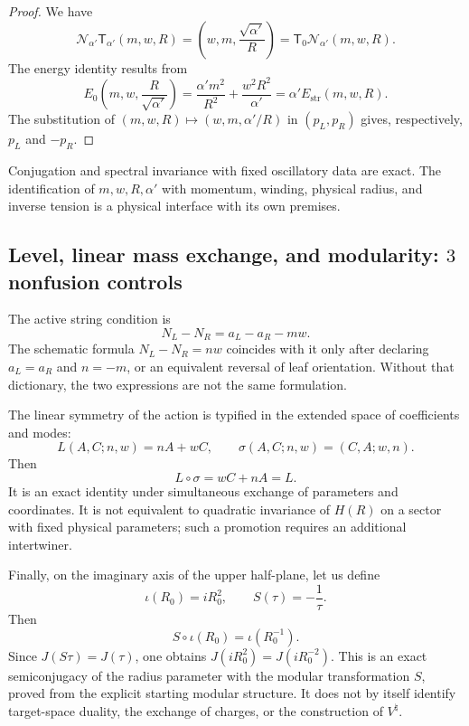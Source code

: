 \begin{proof}
We have
\[
 \mathcal N_{\alpha'}\mathsf T_{\alpha'}(m,w,R)
 =\left(w,m,\frac{\sqrt{\alpha'}}R\right)
 =\mathsf T_0\mathcal N_{\alpha'}(m,w,R).
\]
The energy identity results from
\[
 E_0\!\left(m,w,\frac R{\sqrt{\alpha'}}\right)
 =\frac{\alpha'm^2}{R^2}+\frac{w^2R^2}{\alpha'}
 =\alpha' E_{\mathrm{str}}(m,w,R).
\]
The substitution of
\((m,w,R)\mapsto(w,m,\alpha'/R)\) in \((p_L,p_R)\) gives, respectively,
\(p_L\) and \(-p_R\).
\end{proof}

Conjugation and spectral invariance with fixed oscillatory data are exact.
The identification of \(m,w,R,\alpha'\) with momentum, winding, physical radius,
and inverse tension is a physical interface with its own premises.

\subsection{Level, linear mass exchange, and modularity: \(3\) nonfusion controls}

The active string condition is
\[
 N_L-N_R=a_L-a_R-mw.
\]
The schematic formula \(N_L-N_R=nw\) coincides with it only
after declaring \(a_L=a_R\) and \(n=-m\), or an equivalent reversal of
leaf orientation. Without that dictionary, the two expressions are not the
same formulation.

The linear symmetry of the action is typified in the extended space of
coefficients and modes:
\[
 L(A,C;n,w)=nA+wC,
 \qquad
 \sigma(A,C;n,w)=(C,A;w,n).
\]
Then
\[
 L\circ\sigma=wC+nA=L.
\]
It is an exact identity under simultaneous exchange of parameters and
coordinates. It is not equivalent to quadratic invariance of \(H(R)\) on a
sector with fixed physical parameters; such a promotion requires an
additional intertwiner.

Finally, on the imaginary axis of the upper half-plane, let us define
\[
 \iota(R_0)=iR_0^2,
 \qquad S(\tau)=-\frac1\tau.
\]
Then
\[
 \boxed{S\circ\iota(R_0)=\iota(R_0^{-1}).}
\]
Since \(J(S\tau)=J(\tau)\), one obtains
\(J(iR_0^2)=J(iR_0^{-2})\). This is an exact semiconjugacy of the radius
parameter with the modular transformation \(S\), proved from the explicit
starting modular structure. It does not by itself identify target-space
duality, the exchange of charges, or the construction of
\(V^\natural\).
